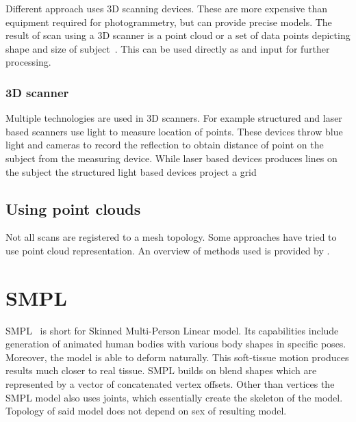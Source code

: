 Different approach uses 3D scanning devices. These are more expensive than equipment required for photogrammetry, but can provide precise models. The result of scan using a 3D scanner is a point cloud or a set of data points depicting shape and size of subject~\cite{3dScan}. This can be used directly as and input for further processing.
\subsubsection{3D scanner}
Multiple technologies are used in 3D scanners. For example structured and laser based scanners use light to measure location of points. These devices throw blue light and cameras to record the reflection to obtain distance of point on the subject from the measuring device. While laser based devices produces lines on the subject the structured light based devices project a grid


\subsection{Using point clouds}
Not all scans are registered to a mesh topology. Some approaches have tried to use point cloud representation. An overview of methods used is provided by \cite{pointcloudMultiple}. 







\section{SMPL}
SMPL~\cite{smpl} is short for Skinned Multi-Person Linear model. Its capabilities include generation of animated human bodies with various body shapes in specific poses. Moreover, the model is able to deform naturally. This soft-tissue motion produces results much closer to real tissue. SMPL builds on blend shapes which are represented by a vector of concatenated vertex offsets. Other than vertices the SMPL model also uses joints, which essentially create the skeleton of the model. Topology of said model does not depend on sex of resulting model.



